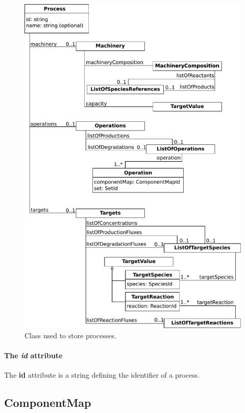 \begin{figure}
  \centering
  \includegraphics[scale=0.9]{figures/processes_process}
  \caption{Class used to store processes.}
\label{fig:processes_process}
\end{figure}

\paragraph{The \textit{id} attribute}
The \textbf{id} attribute is a string defining the identifier of a process.


\subsection{ComponentMap}
\label{sec:component_map}


